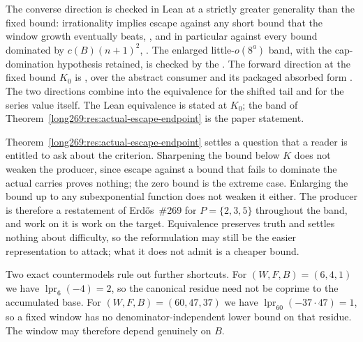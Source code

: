 \documentclass[11pt]{article}
\newcommand{\lpr}{\operatorname{lpr}}
\begin{document}
\noindent The converse direction is checked in Lean at a strictly greater
generality than the fixed bound: irrationality implies escape against any short
bound that the window growth eventually beats,
,
and in particular against every bound dominated by $c(B)(n+1)^{2}$,
.
The enlarged little-$o(8^a)$ band, with the cap-domination hypothesis retained, is checked by the
.  The forward direction at the fixed bound $K_0$ is
,
over the abstract consumer
and its packaged absorbed form
.
The two directions combine into the equivalence
for the shifted tail and
for the series value itself.  The Lean equivalence is stated at $K_0$; the band
of Theorem~\ref{long269:res:actual-escape-endpoint} is the paper statement.

Theorem~\ref{long269:res:actual-escape-endpoint} settles a question that a reader is
entitled to ask about the criterion.  Sharpening the bound below $K$ does not
weaken the producer, since escape against a bound that fails to dominate the
actual carries proves nothing; the zero bound is the extreme case.  Enlarging
the bound up to any subexponential function does not weaken it either.  The
producer is therefore a restatement of Erd\H{o}s~\#269 for $P=\{2,3,5\}$
throughout the band, and work on it is work on the target.  Equivalence
preserves truth and settles nothing about difficulty, so the reformulation may
still be the easier representation to attack; what it does not admit is a
cheaper bound.

Two exact countermodels rule out further shortcuts.  For $(W,F,B)=(6,4,1)$ we
have $\lpr_6(-4)=2$, so the canonical residue need not be coprime to the
accumulated base.  For $(W,F,B)=(60,47,37)$ we have
$\lpr_{60}(-37\cdot47)=1$, so a fixed window has no denominator-independent
lower bound on that residue.  The window may therefore depend genuinely on $B$.
\end{document}
